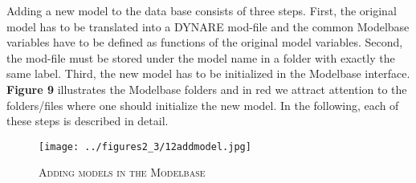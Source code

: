 Adding a new model to the data base consists of three steps. First, the original model has to be translated into a DYNARE mod-file and the common Modelbase variables have to be defined as functions of the original model variables. Second, the mod-file must be stored under the model name in a folder with exactly the same label. Third, the new model has to be initialized in the Modelbase interface.  {\bf Figure 9} illustrates the Modelbase folders and in red we attract attention to the folders/files where one should initialize the new model. In the following, each of these steps is described in detail. \\

\begin{figure}[H]
\centering
\caption{\textsc{Adding models in the Modelbase}}
\vspace{0.2cm}
\texttt{[image: ../figures2\_3/12addmodel.jpg]}
\label{img:MenuStructure6}
\end{figure}


